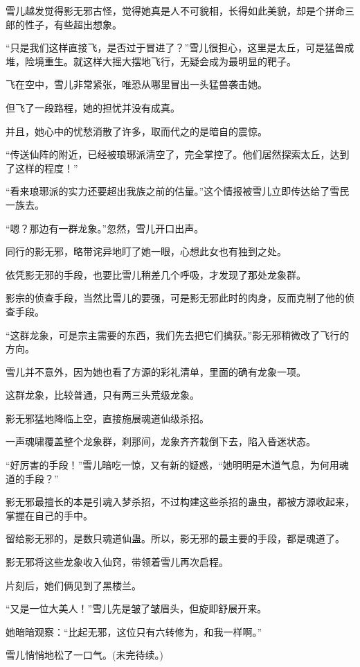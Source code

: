 \begin{this_body}
雪儿越发觉得影无邪古怪，觉得她真是人不可貌相，长得如此美貌，却是个拼命三郎的性子，有些超出想象。

“只是我们这样直接飞，是否过于冒进了？”雪儿很担心，这里是太丘，可是猛兽成堆，险境重生。就这样大摇大摆地飞行，无疑会成为最明显的靶子。

飞在空中，雪儿非常紧张，唯恐从哪里冒出一头猛兽袭击她。

但飞了一段路程，她的担忧并没有成真。

并且，她心中的忧愁消散了许多，取而代之的是暗自的震惊。

“传送仙阵的附近，已经被琅琊派清空了，完全掌控了。他们居然探索太丘，达到了这样的程度！”

“看来琅琊派的实力还要超出我族之前的估量。”这个情报被雪儿立即传达给了雪民一族去。

“嗯？那边有一群龙象。”忽然，雪儿开口出声。

同行的影无邪，略带诧异地盯了她一眼，心想此女也有独到之处。

依凭影无邪的手段，也要比雪儿稍差几个呼吸，才发现了那处龙象群。

影宗的侦查手段，当然比雪儿的要强，可是影无邪此时的肉身，反而克制了他的侦查手段。

“这群龙象，可是宗主需要的东西，我们先去把它们擒获。”影无邪稍微改了飞行的方向。

雪儿并不意外，因为她也看了方源的彩礼清单，里面的确有龙象一项。

这群龙象，比较普通，只有两三头荒级龙象。

影无邪猛地降临上空，直接施展魂道仙级杀招。

一声魂啸覆盖整个龙象群，刹那间，龙象齐齐栽倒下去，陷入昏迷状态。

“好厉害的手段！”雪儿暗吃一惊，又有新的疑惑，“她明明是木道气息，为何用魂道的手段？”

影无邪最擅长的本是引魂入梦杀招，不过构建这些杀招的蛊虫，都被方源收起来，掌握在自己的手中。

留给影无邪的，是数只魂道仙蛊。所以，影无邪的最主要的手段，都是魂道了。

影无邪将这些龙象收入仙窍，带领着雪儿再次启程。

片刻后，她们俩见到了黑楼兰。

“又是一位大美人！”雪儿先是皱了皱眉头，但旋即舒展开来。

她暗暗观察：“比起无邪，这位只有六转修为，和我一样啊。”

雪儿悄悄地松了一口气。(未完待续。)

\end{this_body}

